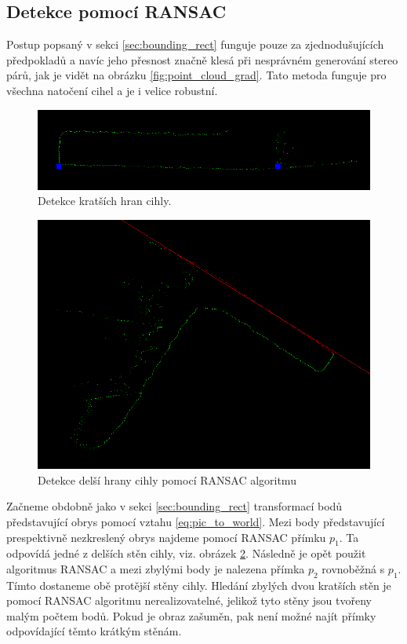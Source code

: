 \documentclass[twoside]{ctuthesis}
\begin{document}
\subsection{Detekce pomocí RANSAC}
\label{sec:ransac_det}
Postup popsaný v sekci \ref{sec:bounding_rect} funguje pouze za zjednodušujících předpokladů a navíc jeho přesnost značně klesá při nesprávném generování stereo párů, jak je vidět na obrázku \ref{fig:point_cloud_grad}. Tato metoda funguje pro všechna natočení cihel a je i velice robustní.
\begin{figure}
    \centering
    \includegraphics[width = \linewidth]{pictures/crop_ransac_rot.png}
    \caption{Detekce kratších hran cihly.}
    \label{fig:RANSAC_line_short}
\end{figure}
\begin{figure}
    \centering
    \includegraphics[width = \linewidth]{pictures/ransac_rect_fit1.png}
    \caption{Detekce delší hrany cihly pomocí RANSAC algoritmu}
    \label{fig:RANSAC_line}
\end{figure}

Začneme obdobně jako v sekci \ref{sec:bounding_rect} transformací bodů představující obrys pomocí vztahu \ref{eq:pic_to_world}. Mezi body představující prespektivně nezkreslený obrys najdeme pomocí RANSAC přímku $p_1$. Ta odpovídá jedné z delších stěn cihly, viz. obrázek \ref{fig:RANSAC_line}. Následně je opět použit algoritmus RANSAC a mezi zbylými body je nalezena přímka $p_2$ rovnoběžná s $p_1$. Tímto dostaneme obě protější stěny cihly. Hledání zbylých dvou kratších stěn je pomocí RANSAC algoritmu nerealizovatelné, jelikož tyto stěny jsou tvořeny malým počtem bodů. Pokud je obraz zašuměn, pak není možné najít přímky odpovídající těmto krátkým stěnám.
\end{document}
